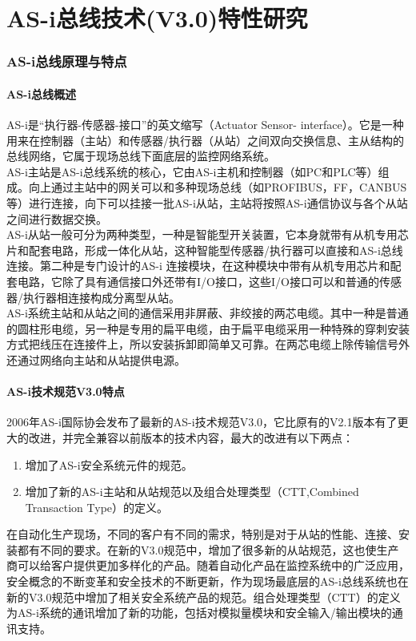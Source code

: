 \part{AS-i总线技术(V3.0)特性研究}
\section{AS-i总线原理与特点}
\subsection{AS-i总线概述}
AS-i是“执行器-传感器-接口”的英文缩写（Actuator Sensor- interface）。它是一种用来在控制器（主站）和传感器/执行器（从站）之间双向交换信息、主从结构的总线网络，它属于现场总线下面底层的监控网络系统。\\
AS-i主站是AS-i总线系统的核心，它由AS-i主机和控制器（如PC和PLC等）组成。向上通过主站中的网关可以和多种现场总线（如PROFIBUS，FF，CANBUS等）进行连接，向下可以挂接一批AS-i从站，主站将按照AS-i通信协议与各个从站之间进行数据交换。\\
AS-i从站一般可分为两种类型，一种是智能型开关装置，它本身就带有从机专用芯片和配套电路，形成一体化从站，这种智能型传感器/执行器可以直接和AS-i总线连接。第二种是专门设计的AS-i 连接模块，在这种模块中带有从机专用芯片和配套电路，它除了具有通信接口外还带有I/O接口，这些I/O接口可以和普通的传感器/执行器相连接构成分离型从站。\\
AS-i系统主站和从站之间的通信采用非屏蔽、非绞接的两芯电缆。其中一种是普通的圆柱形电缆，另一种是专用的扁平电缆，由于扁平电缆采用一种特殊的穿刺安装方式把线压在连接件上，所以安装拆卸即简单又可靠。在两芯电缆上除传输信号外还通过网络向主站和从站提供电源。
\subsection{AS-i技术规范V3.0特点}
2006年AS-i国际协会发布了最新的AS-i技术规范V3.0，它比原有的V2.1版本有了更大的改进，并完全兼容以前版本的技术内容，最大的改进有以下两点：
\begin{enumerate}
\item 增加了AS-i安全系统元件的规范。
\item 增加了新的AS-i主站和从站规范以及组合处理类型（CTT,Combined Transaction Type）的定义。
\end{enumerate}
在自动化生产现场，不同的客户有不同的需求，特别是对于从站的性能、连接、安装都有不同的要求。在新的V3.0规范中，增加了很多新的从站规范，这也使生产商可以给客户提供更加多样化的产品。随着自动化产品在监控系统中的广泛应用，安全概念的不断变革和安全技术的不断更新，作为现场最底层的AS-i总线系统也在新的V3.0规范中增加了相关安全系统产品的规范。组合处理类型（CTT）的定义为AS-i系统的通讯增加了新的功能，包括对模拟量模块和安全输入/输出模块的通讯支持。
